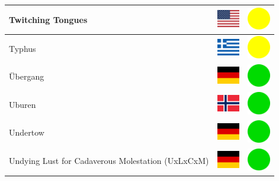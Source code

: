 \documentclass[12pt, a4paper, twoside]{report}
\begin{document}
\begin{center}
\begin{longtable}{|p{5cm}|p{2cm}|p{2cm}|}
 Twitching Tongues                                          & \includegraphics[width=1cm]{../4x3/us} &   \includegraphics[width=1cm]{../likes/m} \\ \hline
 Typhus                                                     & \includegraphics[width=1cm]{../4x3/gr} &   \includegraphics[width=1cm]{../likes/m} \\ \hline
 Übergang                                                   & \includegraphics[width=1cm]{../4x3/de} &   \includegraphics[width=1cm]{../likes/y} \\ \hline
 Uburen                                                     & \includegraphics[width=1cm]{../4x3/no} &   \includegraphics[width=1cm]{../likes/y} \\ \hline
 Undertow                                                   & \includegraphics[width=1cm]{../4x3/de} &   \includegraphics[width=1cm]{../likes/y} \\ \hline
 Undying Lust for Cadaverous Molestation (UxLxCxM)          & \includegraphics[width=1cm]{../4x3/de} &   \includegraphics[width=1cm]{../likes/y} \\ \hline

\end{longtable}
\end{center}
\end{document}

